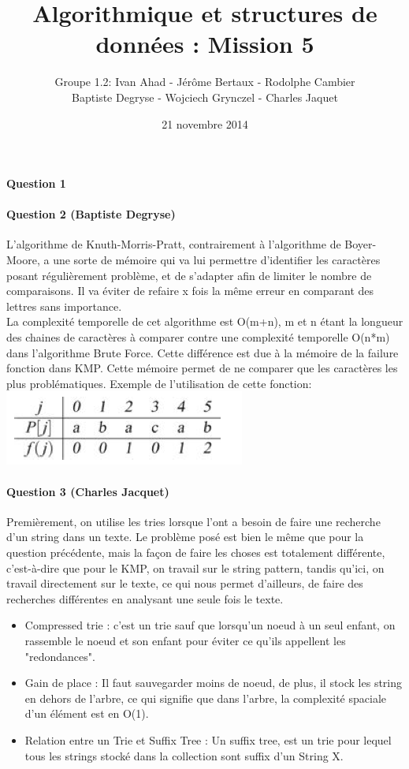 \documentclass[a4paper]{article}
\title{Algorithmique et structures de données : Mission 5}
\date{21 novembre 2014}
\author{Groupe 1.2: Ivan Ahad - Jérôme Bertaux - Rodolphe Cambier \\ 
	Baptiste Degryse - Wojciech Grynczel - Charles Jaquet}
\begin{document}
\maketitle

\paragraph*{Question 1}
\paragraph*{Question 2 (Baptiste Degryse)}
L'algorithme de Knuth-Morris-Pratt, contrairement à l'algorithme de Boyer-Moore, a une sorte de mémoire qui va lui permettre d'identifier les caractères posant régulièrement problème, et de s'adapter afin de limiter le nombre de comparaisons. Il va éviter de refaire x fois la même erreur en comparant des lettres sans importance.\\

La complexité temporelle de cet algorithme est O(m+n), m et n étant la longueur des chaines de caractères à comparer contre une complexité temporelle O(n*m) dans l'algorithme Brute Force. Cette différence est due à la mémoire de la failure fonction dans  KMP. Cette mémoire permet de ne comparer que les caractères les plus problématiques. Exemple de l'utilisation de cette fonction:\\
\includegraphics[scale=1]{imgFailure.png}

\paragraph*{Question 3 (Charles Jacquet)} 

Premièrement, on utilise les tries lorsque l'ont a besoin de faire une recherche d'un string dans un texte. Le problème posé est bien le même que pour la question précédente, mais la façon de faire les choses est totalement différente, c'est-à-dire que pour le KMP, on travail sur le string pattern, tandis qu'ici, on travail directement sur le texte, ce qui nous permet d'ailleurs, de faire des recherches différentes en analysant une seule fois le texte.
\begin{itemize}
\item {Compressed trie} : c'est un trie sauf que lorsqu'un noeud à un seul enfant, on rassemble le noeud et son enfant pour éviter ce qu'ils appellent les "redondances".
\item {Gain de place} : Il faut sauvegarder moins de noeud, de plus, il stock les string en dehors de l'arbre, ce qui signifie que dans l'arbre, la complexité spaciale d'un élément est en O(1).
\item {Relation entre un Trie et Suffix Tree} : Un suffix tree, est un trie pour lequel tous les strings stocké dans la collection sont suffix d'un String X.
\end{itemize}
\end{document}
